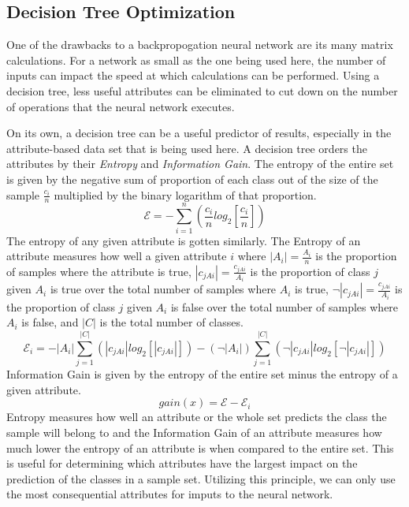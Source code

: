 \documentclass[12pt]{article}
\begin{document}
    \subsection{Decision Tree Optimization}
        One of the drawbacks to a backpropogation neural network are its many matrix calculations.  For a network as small as the
        one being used here, the number of inputs can impact the speed at which calculations can be performed.  Using a decision tree,
        less useful attributes can be eliminated to cut down on the number of operations that the neural network executes.

        On its own, a decision tree can be a useful predictor of results, especially in the attribute-based data set that is being used here.
        A decision tree orders the attributes by their \textit{Entropy} and \textit{Information Gain}.  The entropy of the entire set is given by the negative 
        sum of proportion of each class out of the size of the sample \(\frac{c_i}{n}\) multiplied by the binary logarithm of that proportion. 
        \begin{equation}\label{totalEntropy}
            \mathcal{E} = -\sum_{i=1}^{n} (\frac{c_i}{n} log_2[\frac{c_i}{n}])
        \end{equation}
        The entropy of any given attribute is gotten similarly.
        The Entropy of an attribute measures how well a given attribute \(i\) where \(|A_i| = \frac{A_i}{n}\) is the proportion of samples where the attribute is true,
        \(|c_{jAi}| = \frac{c_{jAi}}{A_i}\) is the proportion of class \(j\) given \(A_i\) is true over the total number of samples where \(A_i\) is true,
        \(\neg|c_{jAi}| = \frac{c_{jAi}}{~A_i}\) is the proportion of class \(j\) given \(A_i\) is false over the total number of samples where \(A_i\) is false, 
        and \(|C|\) is the total number of classes.
        \begin{equation}\label{attribInfoGain}
            \mathcal{E}_i = -|A_i| \sum_{j=1}^{|C|} (|c_{jAi}| log_2[|c_{jAi}|]) - (\neg|A_i|) \sum_{j=1}^{|C|} (\neg|c_{jAi}| log_2[\neg|c_{jAi}|])
        \end{equation} 
        Information Gain is given by the entropy of the entire set minus the entropy of a given attribute.
        \begin{equation}\label{infoGain}
            gain(x) = \mathcal{E} - \mathcal{E}_i
        \end{equation} 
        Entropy measures how well an attribute or the whole set predicts the class the sample will belong to and the 
        Information Gain of an attribute measures how much lower the entropy of
        an attribute is when compared to the entire set.  This is useful for determining which attributes have the largest impact on the
        prediction of the classes in a sample set.  Utilizing this principle, we can only use the most consequential attributes for imputs to the
        neural network.
\end{document}
